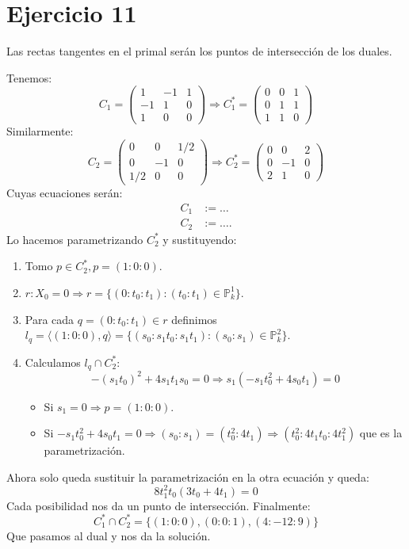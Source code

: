 \documentclass[10pt,a4paper,openright]{book}
\theoremstyle{break}
\begin{document}
\section{Ejercicio 11}%
\label{sec:ejercicio_11_4}
Las rectas tangentes en el primal serán los puntos de intersección de los duales.

Tenemos:
\[
    C_1 = \begin{pmatrix} 1 & -1 & 1\\ -1 & 1 & 0\\ 1 & 0 & 0 \end{pmatrix} \Rightarrow C_1^* = \begin{pmatrix} 0 & 0 & 1\\ 0 & 1 & 1\\ 1 & 1 & 0 \end{pmatrix} 
\]
Similarmente:
\[
    C_2 = \begin{pmatrix} 0 & 0 & 1/2\\ 0 & -1 & 0\\ 1/2 & 0 & 0 \end{pmatrix} \Rightarrow C_2^* = \begin{pmatrix} 0 & 0 & 2\\ 0 & -1 & 0\\ 2 & 1 & 0 \end{pmatrix} 
\]
Cuyas ecuaciones serán:
\begin{align*}
    C_1 &:=\ldots\\
    C_2 &:=\ldots
.\end{align*}
Lo hacemos parametrizando $C_2^*$ y sustituyendo:
\begin{enumerate}
    \item Tomo $p \in C_2^*, p = \left( 1 : 0 : 0 \right)$.
    \item $r : X_0 = 0 \Rightarrow r = \{\left( 0 : t_0 : t_1 \right) : \left( t_0 : t_1 \right) \in \mathbb{P}^{1}_{k}\}$.
    \item Para cada $q = \left( 0 : t_0 : t_1 \right) \in r$ definimos $l_q = \langle \left( 1 : 0 : 0 \right), q \rangle = \{\left( s_0 : s_1t_0 : s_1t_1 \right) : \left( s_0 : s_1 \right) \in \mathbb{P}^{2}_{k}\}$.
    \item Calculamos $l_q \cap C_2^*$: 
    \[
    - \left( s_1t_0 \right)^2 + 4s_1t_1s_0 = 0 \Rightarrow s_1\left( -s_1t_0^2 + 4s_0t_1 \right) = 0
    \]
    \begin{itemize}
        \item Si $s_1 = 0 \Rightarrow p = \left( 1 : 0 : 0 \right)$.
        \item Si $-s_1t_0^2 + 4s_0t_1 = 0 \Rightarrow \left( s_0 : s_1 \right) = \left( t_0^2 : 4t_1 \right) \Rightarrow \left( t_0^2 : 4t_1t_0 : 4t_1^2 \right)$ que es la parametrización.
    \end{itemize}
\end{enumerate}
Ahora solo queda sustituir la parametrización en la otra ecuación y queda:
\[
8t_1^2t_0\left( 3t_0 + 4t_1 \right) = 0
\]
Cada posibilidad nos da un punto de intersección. Finalmente:
\[
C_1^* \cap C_2^* = \{\left( 1 : 0 : 0 \right), \left( 0 : 0 : 1 \right), \left( 4 : -12 : 9 \right)\} 
\]
Que pasamos al dual y nos da la solución.
\end{document}
